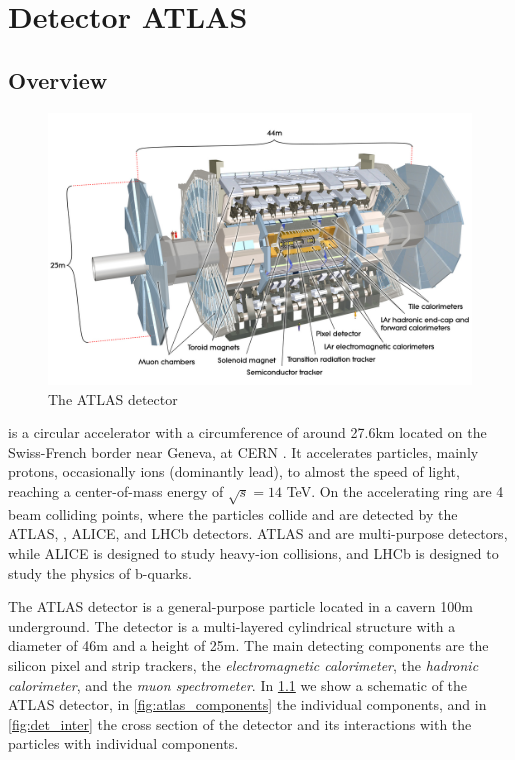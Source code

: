\chapter{Detector ATLAS}

\section{Overview}
\begin{figure}[htb]
    \centering
    \includegraphics[width=1\linewidth]{src/img/atlas.jpg}
    \caption{The ATLAS detector}
    \label{fig:atlas}
\end{figure}

\LHC is a circular accelerator with a circumference of around 27.6km located on the Swiss-French border near Geneva, at CERN \cite{cern}.
It accelerates particles, mainly protons, occasionally ions (dominantly lead), to almost the speed of light, reaching a center-of-mass energy of $\sqrt{s} = 14$ TeV.
On the accelerating ring are 4 beam colliding points, where the particles collide and are detected by the ATLAS, \CMS, ALICE, and LHCb detectors.
ATLAS and \CMS are multi-purpose detectors, while ALICE is designed to study heavy-ion collisions, and LHCb is designed to study the physics of b-quarks.


The ATLAS detector \cite{ATLAS} is a general-purpose particle located in a cavern 100m underground.
The detector is a multi-layered cylindrical structure with a diameter of 46m and a height of 25m.
The main detecting components are the silicon pixel and strip trackers, the \emph{electromagnetic \LAr calorimeter}, the\emph{ hadronic calorimeter}, and the\emph{ muon spectrometer}.
In \cref{fig:atlas} we show a schematic of the ATLAS detector, in \cref{fig:atlas_components} the individual components, and in \cref{fig:det_inter} the cross section of the detector and its interactions with the particles with individual components.

